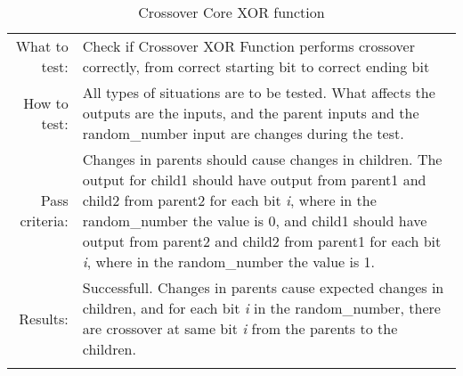 \begin{table}[H]
  \begin{tabular}{r | p{8cm}}
    \noalign{\smallskip}\hline\noalign{\smallskip}
    
    What to test:  & Check if Crossover XOR Function performs crossover
                     correctly, from correct starting bit to correct ending bit \\

    \noalign{\smallskip}\hline\noalign{\smallskip}

    How to test:   &    All types of situations are to be tested. 
                        What affects the outputs are the inputs, and the parent inputs            
                        and the random\_number input are changes during the test. 
                        \\
                      
    \noalign{\smallskip}\hline\noalign{\smallskip}

    Pass criteria: &    Changes in parents should cause changes in children. 
                        The output for child1 should have output from parent1 and child2
                        from parent2 for each bit \emph{i}, where in the random\_number 
                        the value is 0, and child1 should have output from parent2 and 
                        child2 from parent1 for each bit \emph{i}, where in the 
                        random\_number the value is 1.
                        \\
    \noalign{\smallskip}\hline\noalign{\smallskip}
    
    Results: &      Successfull. 
                    Changes in parents cause expected changes in children, and for each
                    bit \emph{i} in the random\_number, there are crossover at same bit    
                    \emph{i} from the parents to the children.
                    \\
   \noalign{\smallskip}\hline\noalign{\smallskip}
  
  
  
  \end{tabular}
  \caption{Crossover Core XOR function}
  \label{testing:components:genetic_pipeline:crossover_core_xor}
\end{table}
